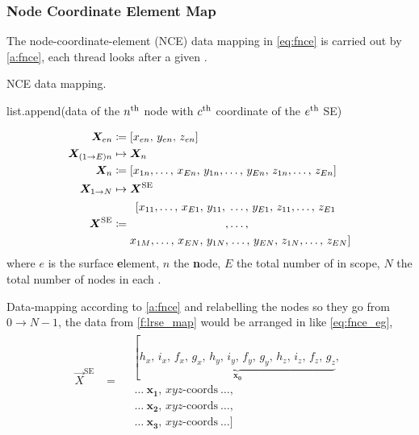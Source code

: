 \subsubsection{Node Coordinate Element Map}
%
The node-coordinate-element (NCE) data mapping in \cref{eq:fnce} is carried out by \cref{a:fnce}, each thread looks after a given .
\begin{algorithm}
	\caption{NCE data mapping.}
	\label{a:fnce}
	\begin{algorithmic}
		\State list.append(data of the $ n\textsuperscript{th}$ node with $ c\textsuperscript{th} $ coordinate of the $ e\textsuperscript{th} $ SE)
		\EndFor
		\EndFor
		\EndFor
	\end{algorithmic}
\end{algorithm}
\begin{subequations}\label{eq:fnce}
	\begin{align}
		\vec{X}_{en}          & \coloneqq \left[x_{en},\, y_{en},\, z_{en}\right]                                                    \\
		\vec{X}_{(1\to E)n}   & \mapsto \vec{X}_{n} \nn
		\vec{X}_{n}           & \coloneqq \left[x_{1n},\ldots,\, x_{En},\, y_{1n},\ldots,\, y_{En},\, z_{1n},\ldots,\, z_{En}\right] \\
		\vec{X}_{1\to N}      & \mapsto \vec{X}^{\textrm{SE}}\nn
		\vec{X}^{\textrm{SE}} & \coloneqq
		\begin{aligned}
			\left[x_{11},\ldots,\, x_{E1},\, y_{11},\right. & \ldots,\, y_{E1},\, z_{11},\ldots,\, z_{E1}              \\
			,                                               & \ldots,                                                  \\
			x_{1M},\ldots,\, x_{EN},\, y_{1N},              & \left.\ldots,\, y_{EN},\, z_{1N},\ldots,\, z_{EN}\right]
		\end{aligned}
	\end{align}
\end{subequations}
where $ e $ is the surface \textbf{e}lement, $ n $ the \textbf{n}ode, $ E $ the total number of  in scope, $ N $ the total number of nodes in each .

Data-mapping according to \cref{a:fnce} and relabelling the nodes so they go from $ 0 \to N-1 $, the data from \cref{f:lrse_map} would be arranged in  like \cref{eq:fnce_eg},
\begin{align}\label{eq:fnce_eg}
	\vec{X}^{\textrm{SE}} & = \begin{aligned}
		 & \left[\underbrace{h_{x},\, i_{x},\, f_{x},\, g_{x},\,
			h_{y},\, i_{y},\, f_{y},\, g_{y},\,
		h_{z},\, i_{z},\, f_{z},\, g_{z}}_{\mathbf{x_{0}}}\right., \\
		 & ~\ldots~\mathbf{x_{1}},\, xyz\textrm{-coords}~\ldots,   \\
		 & ~\ldots~\mathbf{x_{2}},\, xyz\textrm{-coords}~\ldots,   \\
		 & ~\ldots~\mathbf{x_{3}},\, xyz\textrm{-coords}~\ldots]
	\end{aligned}
\end{align}
%
